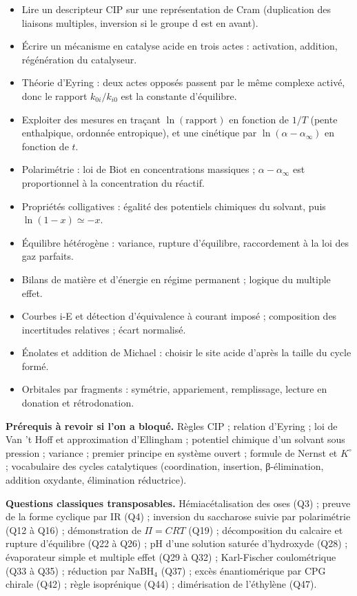 \documentclass[11pt,a4paper]{article}
\providecommand{\tightlist}{\setlength{\itemsep}{0pt}\setlength{\parskip}{0pt}}
\begin{document}
\begin{itemize}
\tightlist
\item
  Lire un descripteur CIP sur une représentation de Cram (duplication des liaisons multiples, inversion si le groupe d est en avant).
\item
  Écrire un mécanisme en catalyse acide en trois actes : activation, addition, régénération du catalyseur.
\item
  Théorie d'Eyring : deux actes opposés passent par le même complexe activé, donc le rapport \(k_{0i}/k_{i0}\) est la constante d'équilibre.
\item
  Exploiter des mesures en traçant \(\ln(\text{rapport})\) en fonction de \(1/T\) (pente enthalpique, ordonnée entropique), et une cinétique par \(\ln(\alpha-\alpha_\infty)\) en fonction de \(t\).
\item
  Polarimétrie : loi de Biot en concentrations massiques ; \(\alpha-\alpha_\infty\) est proportionnel à la concentration du réactif.
\item
  Propriétés colligatives : égalité des potentiels chimiques du solvant, puis \(\ln(1-x)\simeq-x\).
\item
  Équilibre hétérogène : variance, rupture d'équilibre, raccordement à la loi des gaz parfaits.
\item
  Bilans de matière et d'énergie en régime permanent ; logique du multiple effet.
\item
  Courbes i-E et détection d'équivalence à courant imposé ; composition des incertitudes relatives ; écart normalisé.
\item
  Énolates et addition de Michael : choisir le site acide d'après la taille du cycle formé.
\item
  Orbitales par fragments : symétrie, appariement, remplissage, lecture en donation et rétrodonation.
\end{itemize}

\textbf{Prérequis à revoir si l'on a bloqué.} Règles CIP ; relation d'Eyring ; loi de Van 't Hoff et approximation d'Ellingham ; potentiel chimique d'un solvant sous pression ; variance ; premier principe en système ouvert ; formule de Nernst et \(K^\circ\) ; vocabulaire des cycles catalytiques (coordination, insertion, β-élimination, addition oxydante, élimination réductrice).

\textbf{Questions classiques transposables.} Hémiacétalisation des oses (Q3) ; preuve de la forme cyclique par IR (Q4) ; inversion du saccharose suivie par polarimétrie (Q12 à Q16) ; démonstration de \(\Pi=CRT\) (Q19) ; décomposition du calcaire et rupture d'équilibre (Q22 à Q26) ; pH d'une solution saturée d'hydroxyde (Q28) ; évaporateur simple et multiple effet (Q29 à Q32) ; Karl-Fischer coulométrique (Q33 à Q35) ; réduction par \(\mathrm{NaBH_4}\) (Q37) ; excès énantiomérique par CPG chirale (Q42) ; règle isoprénique (Q44) ; dimérisation de l'éthylène (Q47).
\end{document}
